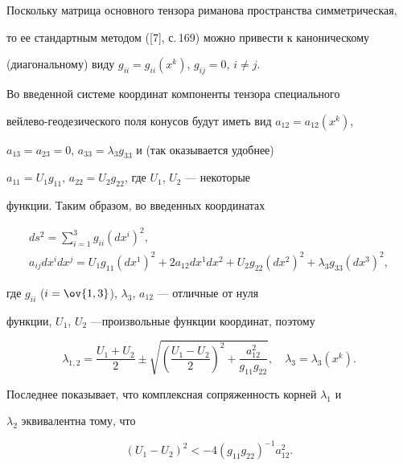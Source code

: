  


Поскольку матрица основного тензора риманова пространства симметрическая, 


то ее стандартным методом ([7], с.\,169) можно привести к каноническому 


(диагональному) виду $g_{ii}=g_{ii}(x^k)$, $g_{ij}=0$, $i\ne j$. 


 


Во введенной системе координат компоненты тензора специального


вейлево-геодезического поля конусов будут иметь вид $a_{12}=a_{12}(x^k)$, 


$a_{13}=a_{23}=0$, $a_{33}=\lambda_3g_{33}$ и (так оказывается удобнее) 


$a_{11}=U_1g_{11}$, $a_{22}=U_2g_{22}$, где $U_1$, $U_2$ --- некоторые 


функции. Таким образом, во введенных координатах 


\begin{gather} 


ds^2=\sum^3_{i=1}g_{ii}(dx^i)^2,\\ 


% 


a_{ij}dx^i dx^j=U_1g_{11}(dx^1)^2+2a_{12}dx^1dx^2+ 


U_2g_{22}(dx^2)^2+\lambda_3g_{33}(dx^3)^2, 


\end{gather} 


где $g_{ii}$ ($i=\ov{1,3}$), $\lambda_3$, $a_{12}$ --- отличные от нуля 


функции, $U_1$, $U_2$ ---произвольные функции координат, поэтому 


\begin{equation} 


\lambda_{1,2}=\frac{U_1+U_2}{2}\pm 


\sqrt{\left(\frac{U_1-U_2}{2}\right)^2+\frac{a_{12}^2}{g_{11}g_{22}}} 


,\quad \lambda_3=\lambda_3(x^k). 


\end{equation} 


Последнее показывает, что комплексная сопряженность корней $\lambda_1$ и 


$\lambda_2$ эквивалентна тому, что 


\begin{equation} 


(U_1-U_2)^2<-4(g_{11}g_{22})^{-1}a^2_{12}. 


\end{equation} 


